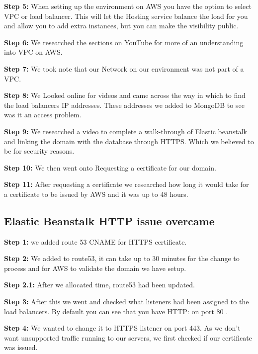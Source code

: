 \textbf{Step 5:}\hfill \break
When setting up the environment on AWS you have the option to select VPC or load balancer. This will let the Hosting service balance the load for you and allow you to add extra instances, but you can make the visibility public.\hfill \break

\textbf{Step 6:}\hfill \break
We researched the sections on YouTube\cite{ref23} for more of an understanding into VPC on AWS. \hfill \break

\textbf{Step 7:}\hfill \break
We took note that our Network on our environment was not part of a VPC.\hfill \break

\textbf{Step 8:}\hfill \break
We Looked online for videos and came across the way in which to find the load balancers IP addresses. These addresses we added to MongoDB to see was it an access problem. \hfill \break

\textbf{Step 9:}\hfill \break
We researched a video to complete a walk-through of Elastic beanstalk and linking the domain with the database through HTTPS. Which we believed to be for security reasons.\hfill \break

\textbf{Step 10:}\hfill \break
We then went onto Requesting a certificate for our domain.\hfill \break

\textbf{Step 11:}\hfill \break
After requesting a certificate we researched how long it would take for a certificate to be issued by AWS and it was up to 48 hours.\hfill \break



\hfill \break
\subsection{Elastic Beanstalk HTTP issue overcame}

\hfill \break


\textbf{Step 1:}\hfill \break
we added route 53 CNAME for HTTPS certificate.

\textbf{Step 2:}\hfill \break
We added to route53\cite{ref20}, it can take up to 30 minutes for the change to process and for AWS to validate the domain we have setup.\hfill \break

\textbf{Step 2.1:}\hfill \break
After we allocated time, route53 had been updated.\hfill \break

\textbf{Step 3:}\hfill \break
After this we went and checked what listeners had been assigned to the load balancers. By default you can see that you have HTTP:  on port 80 .\hfill \break

\textbf{Step 4:}\hfill \break
We wanted to change it to HTTPS listener on port 443. As we don’t want unsupported traffic running to our servers, we first checked if our certificate was issued. \hfill \break

